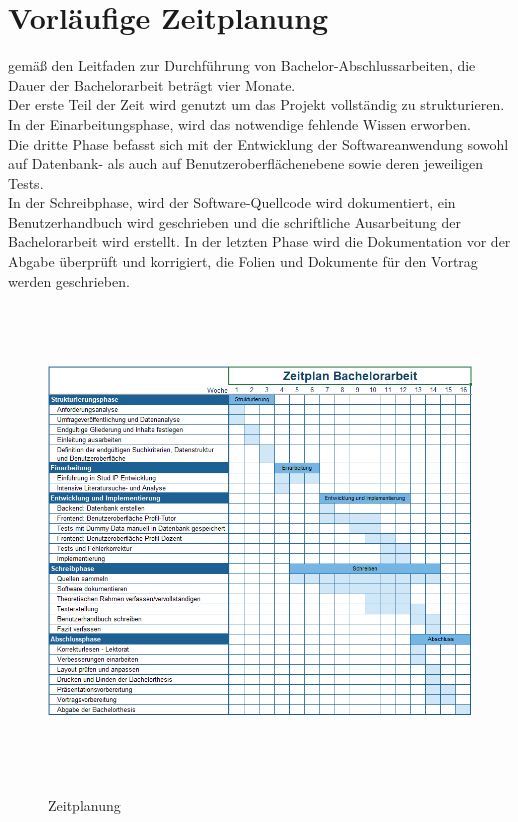 \section{Vorl\"aufige Zeitplanung}
gemäß den Leitfaden zur Durchführung von Bachelor-Abschlussarbeiten\cite{Boles:2015}, die Dauer der Bachelorarbeit beträgt vier Monate.\\
Der erste Teil der Zeit wird genutzt um das Projekt vollständig zu strukturieren. In der Einarbeitungsphase, wird das notwendige fehlende Wissen erworben.\\
Die dritte Phase befasst sich mit der Entwicklung der Softwareanwendung sowohl auf Datenbank- als auch auf Benutzeroberflächenebene sowie deren jeweiligen Tests.\\
In der Schreibphase, wird der Software-Quellcode wird dokumentiert, ein Benutzerhandbuch wird geschrieben und die schriftliche Ausarbeitung der Bachelorarbeit wird erstellt.
In der letzten Phase wird die Dokumentation vor der Abgabe überprüft und korrigiert, die Folien und Dokumente für den Vortrag werden geschrieben.

\begin{figure}[hp]%
    \centering
    \includegraphics[height=12.5cm,keepaspectratio]{pics/zeitplan}\\
    \caption{Zeitplanung}
\end{figure}
